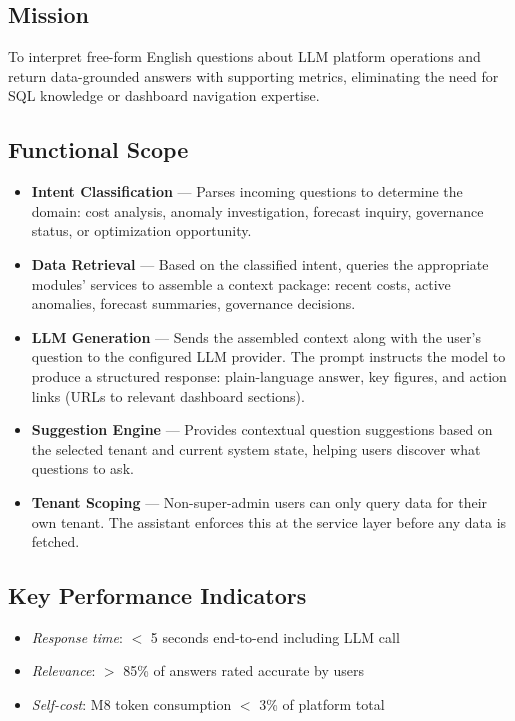 \documentclass[12pt,a4paper,twoside]{report}
\newcommand{\kpi}[1]{\textit{\textcolor{accentgreen}{#1}}}
\begin{document}
\subsection{Mission}
To interpret free-form English questions about LLM platform operations and return data-grounded answers with supporting metrics, eliminating the need for SQL knowledge or dashboard navigation expertise.

\subsection{Functional Scope}

\begin{itemize}
  \item \textbf{Intent Classification} — Parses incoming questions to determine the domain: cost analysis, anomaly investigation, forecast inquiry, governance status, or optimization opportunity.

  \item \textbf{Data Retrieval} — Based on the classified intent, queries the appropriate modules' services to assemble a context package: recent costs, active anomalies, forecast summaries, governance decisions.

  \item \textbf{LLM Generation} — Sends the assembled context along with the user's question to the configured LLM provider. The prompt instructs the model to produce a structured response: plain-language answer, key figures, and action links (URLs to relevant dashboard sections).

  \item \textbf{Suggestion Engine} — Provides contextual question suggestions based on the selected tenant and current system state, helping users discover what questions to ask.

  \item \textbf{Tenant Scoping} — Non-super-admin users can only query data for their own tenant. The assistant enforces this at the service layer before any data is fetched.
\end{itemize}

\subsection{Key Performance Indicators}
\begin{itemize}
  \item \kpi{Response time}: $<$ 5 seconds end-to-end including LLM call
  \item \kpi{Relevance}: $>$ 85\% of answers rated accurate by users
  \item \kpi{Self-cost}: M8 token consumption $<$ 3\% of platform total
\end{itemize}
\end{document}
